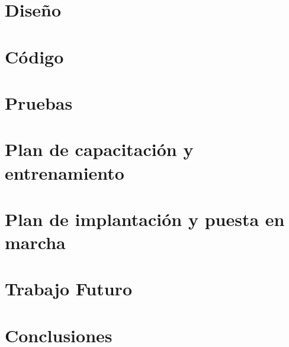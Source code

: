 \documentclass[final,letterpaper,oneside,authoryear,11pt,singlespace,spanish]{ezthesis}
\begin{document}
\chapter{Diseño} 
\chapter{Código} 
\chapter{Pruebas} 
\chapter{Plan de capacitación y entrenamiento} 
\chapter{Plan de implantación y puesta en marcha} 
\chapter{Trabajo Futuro} 
\chapter{Conclusiones} 



\end{document}
